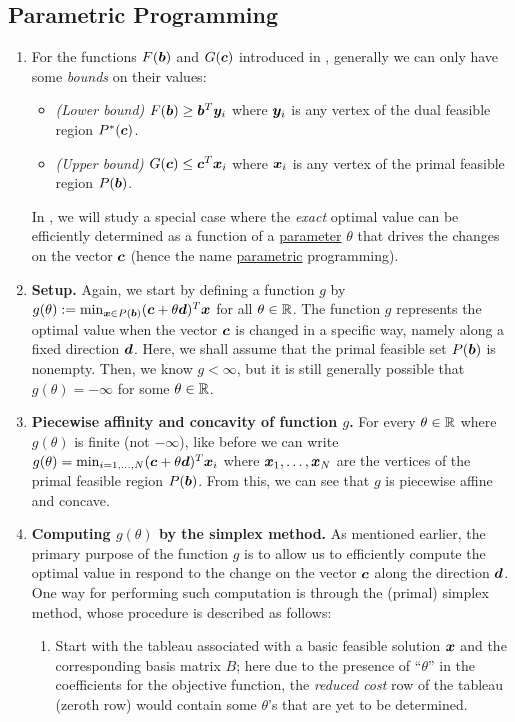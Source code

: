 \subsection{Parametric Programming}
\label{subsect:para-programming}
\begin{enumerate}
\item For the functions \(F(\bm{b})\) and \(G(\bm{c})\) introduced in
, generally we can only have some \emph{bounds} on
their values:
\begin{itemize}
\item \emph{(Lower bound)} \(F(\bm{b})\ge \bm{b}^{T}\bm{y}_i\) where
\(\bm{y}_i\) is any vertex of the dual feasible region \(P^*(\bm{c})\).
\item \emph{(Upper bound)} \(G(\bm{c})\le \bm{c}^{T}\bm{x}_i\) where
\(\bm{x}_i\) is any vertex of the primal feasible region \(P(\bm{b})\).
\end{itemize}
In , we will study a special case where the
\emph{exact} optimal value can be efficiently determined as a function of a
\underline{parameter} \(\theta\) that drives the changes on the vector
\(\bm{c}\) (hence the name \underline{parametric} programming).

\item \textbf{Setup.} Again, we start by defining a function \(g\) by
\(g(\theta):=\min_{\bm{x}\in
P(\bm{b})}(\bm{c}+\theta\bm{d})^{T}\bm{x}\) for all \(\theta\in\mathbb{R}\).
The function \(g\) represents the optimal value when the vector \(\bm{c}\) is
changed in a specific way, namely along a fixed direction \(\bm{d}\).  Here,
we shall assume that the primal feasible set \(P(\bm{b})\) is nonempty. Then,
we know \(g<\infty\), but it is still generally possible that
\(g(\theta)=-\infty\) for some \(\theta\in\mathbb{R}\).

\item \label{it:para-g-piecewise-affine-concave} \textbf{Piecewise affinity and
concavity of function \(g\).} For every \(\theta\in\mathbb{R}\) where \(g(\theta)\) is
finite (not \(-\infty\)), like before we can write
\(g(\theta)=\min_{i=1,\dotsc,N}(\bm{c}+\theta\bm{d})^{T}\bm{x}_i\) where
\(\bm{x}_1,\dotsc,\bm{x}_N\) are the vertices of the primal feasible region
\(P(\bm{b})\). From this, we can see that \(g\) is piecewise affine and
concave.
\item \label{it:cpt-g-proc} \textbf{Computing \(g(\theta)\) by the simplex
method.} As mentioned earlier, the primary purpose of the function \(g\) is to
allow us to efficiently compute the optimal value in respond to the change on
the vector \(\bm{c}\) along the direction \(\bm{d}\). One way for
performing such computation is through the (primal) simplex method, whose procedure is
described as follows:
\begin{enumerate}[label={(\arabic*)}]
\item Start with the tableau associated with a basic feasible solution
\(\bm{x}\) and the corresponding basis matrix \(B\); here due to the presence
of ``\(\theta\)'' in the coefficients for the objective function, the
\emph{reduced cost} row of the tableau (zeroth row) would contain some
\(\theta\)'s that are yet to be determined.


\end{enumerate}
\end{enumerate}
